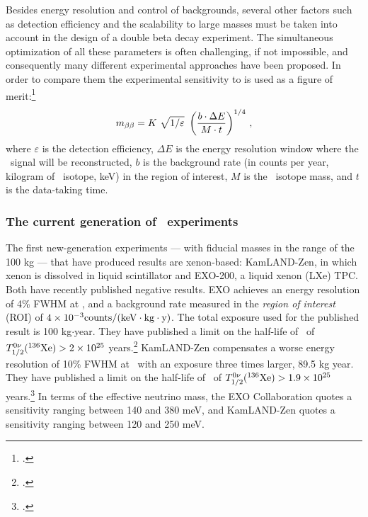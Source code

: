 Besides energy resolution and control of backgrounds, several other factors such as detection efficiency and the scalability to large masses must be taken into account in the design of a double beta decay experiment. The simultaneous optimization of all these parameters is often challenging, if not impossible, and consequently many different experimental approaches have been proposed. In order to compare them the experimental sensitivity to \mbb is used as a figure of merit:\footcite{GomezCadenas:2010gs}
\begin{equation}
\mbb = K \ \sqrt{1/\varepsilon} \ \left(\frac{b\cdot\Delta E}{M\cdot t} \right)^{1/4}\, ,
\label{eq:mbb}
\end{equation}
where $\varepsilon$ is the detection efficiency, $\Delta E$ is the energy resolution window where the \bbonu\ signal will be reconstructed, $b$ is the background rate (in counts per year, kilogram of \bb\ isotope, keV) in the region of interest, $M$ is the \bb\ isotope mass, and $t$ is the data-taking time. 


\subsubsection*{The current generation of \bbonu\ experiments}


 
 The first new-generation experiments --- with fiducial masses in the range of the 100 kg --- that have produced results are xenon-based: KamLAND-Zen, in which xenon is dissolved in liquid scintillator and EXO-200, a liquid xenon (LXe) TPC. Both have recently published negative results. 
 EXO achieves an energy resolution of 4\% FWHM at \Qbb, and a background rate measured in the \emph{region of interest} (ROI) of $ 4 \times 10^{-3}\rm counts/(keV \cdot kg \cdot y)$. The total exposure used for the published result is 100 kg$\cdot$year. They have published a limit on the half-life of \bbonu\ of $T_{1/2}^{0\nu}({}^{136}\rm Xe) > 2 \times 10^{25}$ years.\footcite{Auger:2012ar} 
KamLAND-Zen compensates a worse energy resolution of 10\% FWHM at \Qbb\ with an exposure three times larger, 89.5 kg year. They have published a limit on the half-life of \bbonu\ of $T_{1/2}^{0\nu}({}^{136}\rm Xe) > 1.9 \times 10^{25}$ years.\footcite{Gando:2012zm} In terms of the effective neutrino mass, the EXO Collaboration quotes a sensitivity ranging between 140 and 380 meV, and KamLAND-Zen quotes a sensitivity ranging between 120 and 250 meV. 


